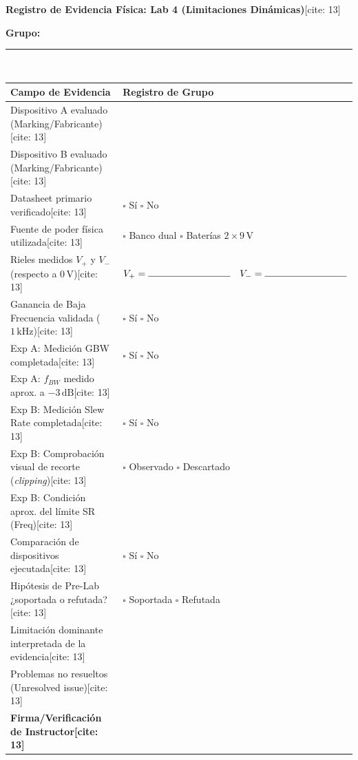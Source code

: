 \documentclass[11pt, a4paper]{article}
\begin{document}
\begin{center}
    \Large\textbf{\textcolor{ucbblue}{Registro de Evidencia Física: Lab 4 (Limitaciones Dinámicas)}}[cite: 13]
\end{center}

\textbf{Grupo:} \rule{10cm}{0.4pt} \\

\begin{table}[h!]
    \centering
    \renewcommand{\arraystretch}{1.5}
    \begin{tabularx}{\textwidth}{|>{\raggedright\arraybackslash}p{6cm}|X|}
    \hline
    \rowcolor[HTML]{EFEFEF} 
    \textbf{Campo de Evidencia} & \textbf{Registro de Grupo} \\ \hline
    Dispositivo A evaluado (Marking/Fabricante)[cite: 13] & \\ \hline
    Dispositivo B evaluado (Marking/Fabricante)[cite: 13] & \\ \hline
    Datasheet primario verificado[cite: 13] & $\square$ Sí \quad $\square$ No \\ \hline
    Fuente de poder física utilizada[cite: 13] & $\square$ Banco dual \quad $\square$ Baterías $2\times 9\,\text{V}$ \\ \hline
    Rieles medidos $V_+$ y $V_-$ (respecto a $0\,\text{V}$)[cite: 13] & $V_+ = \rule{3cm}{0.4pt} \quad V_- = \rule{3cm}{0.4pt}$ \\ \hline
    Ganancia de Baja Frecuencia validada ($1\,\text{kHz}$)[cite: 13] & $\square$ Sí \quad $\square$ No \\ \hline
    Exp A: Medición GBW completada[cite: 13] & $\square$ Sí \quad $\square$ No \\ \hline
    Exp A: $f_{BW}$ medido aprox. a $-3\,\text{dB}$[cite: 13] & \\ \hline
    Exp B: Medición Slew Rate completada[cite: 13] & $\square$ Sí \quad $\square$ No \\ \hline
    Exp B: Comprobación visual de recorte (\textit{clipping})[cite: 13] & $\square$ Observado \quad $\square$ Descartado \\ \hline
    Exp B: Condición aprox. del límite SR (Freq)[cite: 13] & \\ \hline
    Comparación de dispositivos ejecutada[cite: 13] & $\square$ Sí \quad $\square$ No \\ \hline
    Hipótesis de Pre-Lab ¿soportada o refutada?[cite: 13] & $\square$ Soportada \quad $\square$ Refutada \\ \hline
    Limitación dominante interpretada de la evidencia[cite: 13] & \\ \hline
    Problemas no resueltos (Unresolved issue)[cite: 13] & \\ \hline
    \textbf{Firma/Verificación de Instructor[cite: 13]} & \\ \hline
    \end{tabularx}
\end{table}
\end{document}

